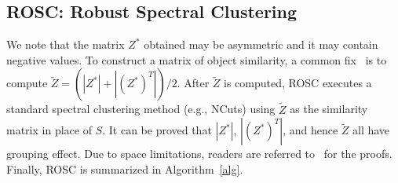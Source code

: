 \subsection*{ROSC: Robust Spectral Clustering}

We note that the matrix $Z^*$ obtained may be asymmetric and it may contain negative values.
To construct a matrix of object similarity, a common fix~\cite{liu2013robust,lu2012robust} is to 
compute $\tilde{Z} = (|Z^*|+|(Z^*)^T|)/2$.
After $\tilde{Z}$ is computed, ROSC executes a standard spectral clustering method
(e.g., NCuts) using $\tilde{Z}$ as the similarity matrix in place of $S$.
It can be proved that $|Z^*|$, $|(Z^*)^T|$, and hence $\tilde{Z}$ all have grouping effect.
Due to space limitations, readers are referred to~\cite{technicalreportrobust} for the proofs. 
Finally, ROSC is summarized in Algorithm~\ref{alg}.

